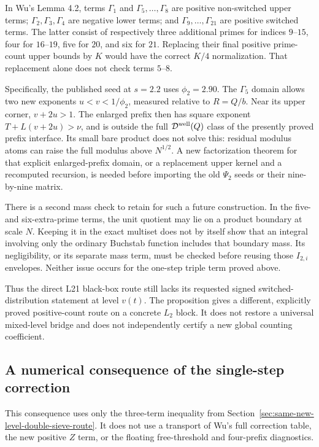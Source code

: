 \documentclass[11pt]{article}
\begin{document}
In Wu's Lemma 4.2, terms $\Gamma_1$ and $\Gamma_5,\ldots,\Gamma_8$
are positive non-switched upper terms; $\Gamma_2,\Gamma_3,\Gamma_4$
are negative lower terms; and $\Gamma_9,\ldots,\Gamma_{21}$ are
positive switched terms. The latter consist of respectively three
additional primes for indices $9$--$15$, four for $16$--$19$, five
for $20$, and six for $21$. Replacing their final positive prime-count
upper bounds by $K$ would have the correct $K/4$ normalization.
That replacement alone does not check terms $5$--$8$.

Specifically, the published seed at $s=2.2$ uses $\phi_2=2.90$.
The $\Gamma_5$ domain allows two new exponents $u<v<1/\phi_2$,
measured relative to $R=Q/b$. Near its upper corner,
$v+2u>1$. The enlarged prefix then has square exponent
$T+L(v+2u)>\nu$, and is outside the full
$\mathcal D^{\rm well}(Q)$ class of the presently proved prefix
interface. Its small bare product does not solve this: residual
modulus atoms can raise the full modulus above $N^{1/2}$.
A new factorization theorem for that explicit enlarged-prefix domain,
or a replacement upper kernel and a recomputed recursion, is needed
before importing the old $\Psi_2$ seeds or their nine-by-nine matrix.

There is a second mass check to retain for such a future construction.
In the five- and six-extra-prime terms, the unit quotient may lie on
a product boundary at scale $N$. Keeping it in the exact multiset
does not by itself show that an integral involving only the ordinary
Buchstab function includes that boundary mass. Its negligibility,
or its separate mass term, must be checked before reusing those
$I_{2,i}$ envelopes. Neither issue occurs for the one-step triple
term proved above.

Thus the direct L21 black-box route still lacks its requested signed
switched-distribution statement at level $v(t)$. The proposition gives
a different, explicitly proved positive-count route on a concrete
$L_2$ block. It does not restore a universal mixed-level bridge and
does not independently certify a new global counting coefficient.

\subsection{A numerical consequence of the single-step correction}
\label{sec:same-level-one-step-corollary}

This consequence uses only the three-term inequality from
Section~\ref{sec:same-new-level-double-sieve-route}. It does not use a
transport of Wu's full correction table, the new positive $Z$ term,
or the floating free-threshold and four-prefix diagnostics.
\end{document}
